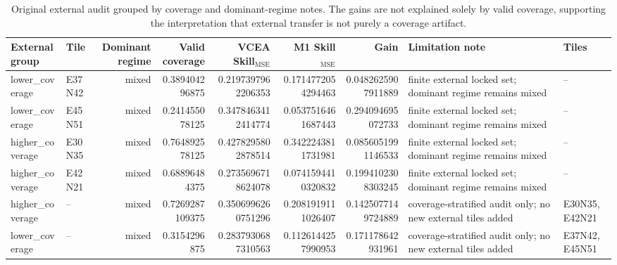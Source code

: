 \begin{table}[t]
\centering
\scriptsize
\begin{adjustbox}{max width=\textwidth}
\begin{tabular}{llrrrrrp{}p{}}
\toprule
External group & Tile & Dominant regime & Valid coverage & VCEA Skill$_{\mathrm{MSE}}$ & M1 Skill$_{\mathrm{MSE}}$ & Gain & Limitation note & Tiles \\
\midrule
lower\_coverage & E37N42 & mixed & 0.389404296875 & 0.2197397962206353 & 0.1714772054294463 & 0.0482625907911889 & finite external locked set; dominant regime remains mixed & -- \\
lower\_coverage & E45N51 & mixed & 0.241455078125 & 0.3478463412414774 & 0.0537516461687443 & 0.294094695072733 & finite external locked set; dominant regime remains mixed & -- \\
higher\_coverage & E30N35 & mixed & 0.764892578125 & 0.4278295802878514 & 0.3422243811731981 & 0.0856051991146533 & finite external locked set; dominant regime remains mixed & -- \\
higher\_coverage & E42N21 & mixed & 0.68896484375 & 0.2735696718624078 & 0.0741594410320832 & 0.1994102308303245 & finite external locked set; dominant regime remains mixed & -- \\
higher\_coverage & -- & mixed & 0.7269287109375 & 0.3506996260751296 & 0.2081919111026407 & 0.1425077149724889 & coverage-stratified audit only; no new external tiles added & E30N35,E42N21 \\
lower\_coverage & -- & mixed & 0.3154296875 & 0.2837930687310563 & 0.1126144257990953 & 0.171178642931961 & coverage-stratified audit only; no new external tiles added & E37N42,E45N51 \\
\bottomrule
\end{tabular}
\end{adjustbox}
\caption{Original external audit grouped by coverage and dominant-regime notes. The gains are not explained solely by valid coverage, supporting the interpretation that external transfer is not purely a coverage artifact.}
\label{tab:e5_external_audit}
\end{table}
